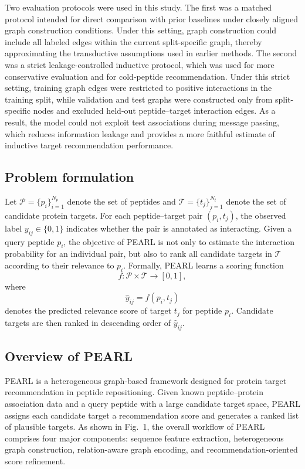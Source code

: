 Two evaluation protocols were used in this study. The first was a matched protocol intended for direct comparison with prior baselines under closely aligned graph construction conditions. Under this setting, graph construction could include all labeled edges within the current split-specific graph, thereby approximating the transductive assumptions used in earlier methods. The second was a strict leakage-controlled inductive protocol, which was used for more conservative evaluation and for cold-peptide recommendation. Under this strict setting, training graph edges were restricted to positive interactions in the training split, while validation and test graphs were constructed only from split-specific nodes and excluded held-out peptide--target interaction edges. As a result, the model could not exploit test associations during message passing, which reduces information leakage and provides a more faithful estimate of inductive target recommendation performance.

\subsection{Problem formulation}

Let $\mathcal{P} = \{p_i\}_{i=1}^{N_p}$ denote the set of peptides and $\mathcal{T} = \{t_j\}_{j=1}^{N_t}$ denote the set of candidate protein targets. For each peptide--target pair $(p_i, t_j)$, the observed label $y_{ij} \in \{0,1\}$ indicates whether the pair is annotated as interacting. Given a query peptide $p_i$, the objective of PEARL is not only to estimate the interaction probability for an individual pair, but also to rank all candidate targets in $\mathcal{T}$ according to their relevance to $p_i$. Formally, PEARL learns a scoring function
\begin{equation}
f : \mathcal{P} \times \mathcal{T} \rightarrow [0,1],
\end{equation}
where
\begin{equation}
\hat{y}_{ij} = f(p_i, t_j)
\end{equation}
denotes the predicted relevance score of target $t_j$ for peptide $p_i$. Candidate targets are then ranked in descending order of $\hat{y}_{ij}$.

\subsection{Overview of PEARL}

PEARL is a heterogeneous graph-based framework designed for protein target recommendation in peptide repositioning. Given known peptide--protein association data and a query peptide with a large candidate target space, PEARL assigns each candidate target a recommendation score and generates a ranked list of plausible targets. As shown in Fig.~1, the overall workflow of PEARL comprises four major components: sequence feature extraction, heterogeneous graph construction, relation-aware graph encoding, and recommendation-oriented score refinement.

